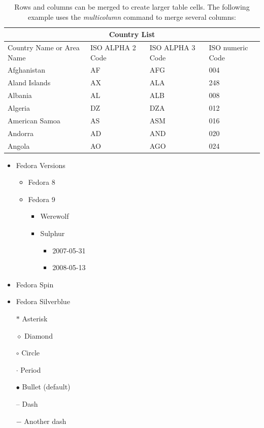 \documentclass[10pt]{article}
\begin{document}
\begin{table}[h!]
    \centering
    \begin{tabular}{ |p{3cm}||p{3cm}|p{3cm}|p{3cm}|  }
    \hline
    \multicolumn{4}{|c|}{Country List} \\
    \hline
     Country Name or Area Name& ISO ALPHA 2 Code &ISO ALPHA 3 Code&ISO numeric Code\\
    \hline
     Afghanistan   & AF    &AFG&   004\\
     Aland Islands&   AX  & ALA   &248\\
     Albania &AL & ALB&  008\\
     Algeria    &DZ & DZA&  012\\
     American Samoa&   AS  & ASM&016\\
     Andorra& AD  & AND   &020\\
     Angola& AO  & AGO&024\\
    \hline
    \end{tabular}
    \caption{Rows and columns can be merged to create larger table cells. The following example uses the \textit{multicolumn} command to merge several columns: }
    \label{tab:my_label}
\end{table}

\lipsum[9][1-5]


\begin{multicols}{2}
\begin{itemize}
    \item Fedora Versions
    \begin{itemize}
        \item Fedora 8
        \item Fedora 9
        \begin{itemize}
            \item Werewolf
            \item Sulphur
            \begin{itemize}
                \item 2007-05-31
                \item 2008-05-13
            \end{itemize}
        \end{itemize}
    \end{itemize}
    \item Fedora Spin
    \item Fedora Silverblue
\end{itemize}

\columnbreak

\begin{itemize}
    \item[$\ast$] Asterisk 
    \item[$\diamond$] Diamond 
    \item[$\circ$] Circle 
    \item[$\cdot$] Period
    \item[$\bullet$] Bullet (default)
    \item[--] Dash
    \item[$-$] Another dash
\end{itemize}

\end{multicols}
\end{document}
